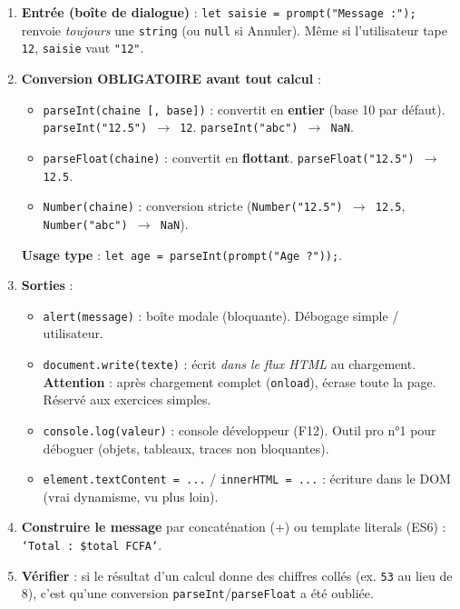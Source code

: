 \documentclass[11pt]{article}
\begin{document}
\begin{methode}
\begin{enumerate}
\item \textbf{Entrée (boîte de dialogue)} : \texttt{let saisie = prompt("Message :");} renvoie \emph{toujours} une \texttt{string} (ou \texttt{null} si Annuler). Même si l'utilisateur tape \texttt{12}, \texttt{saisie} vaut \texttt{"12"}.
\item \textbf{Conversion OBLIGATOIRE avant tout calcul} :
      \begin{itemize}
      \item \texttt{parseInt(chaine [, base])} : convertit en \textbf{entier} (base 10 par défaut). \texttt{parseInt("12.5") $\to$ 12}. \texttt{parseInt("abc") $\to$ NaN}.
      \item \texttt{parseFloat(chaine)} : convertit en \textbf{flottant}. \texttt{parseFloat("12.5") $\to$ 12.5}.
      \item \texttt{Number(chaine)} : conversion stricte (\texttt{Number("12.5") $\to$ 12.5}, \texttt{Number("abc") $\to$ NaN}).
      \end{itemize}
      \textbf{Usage type} : \texttt{let age = parseInt(prompt("Age ?"));}.
\item \textbf{Sorties} :
      \begin{itemize}
      \item \texttt{alert(message)} : boîte modale (bloquante). Débogage simple / utilisateur.
      \item \texttt{document.write(texte)} : écrit \emph{dans le flux HTML} au chargement. \textbf{Attention} : après chargement complet (\texttt{onload}), écrase toute la page. Réservé aux exercices simples.
      \item \texttt{console.log(valeur)} : console développeur (F12). Outil pro n°1 pour déboguer (objets, tableaux, traces non bloquantes).
      \item \texttt{element.textContent = ...} / \texttt{innerHTML = ...} : écriture dans le DOM (vrai dynamisme, vu plus loin).
      \end{itemize}
\item \textbf{Construire le message} par concaténation (+) ou template literals (ES6) : \texttt{`Total : \${total} FCFA`}.
\item \textbf{Vérifier} : si le résultat d'un calcul donne des chiffres collés (ex. \texttt{53} au lieu de $8$), c'est qu'une conversion \texttt{parseInt}/\texttt{parseFloat} a été oubliée.
\end{enumerate}
\end{methode}
\end{document}
